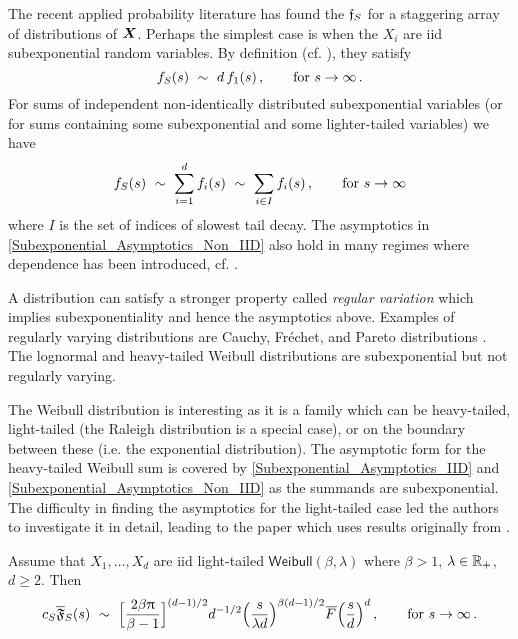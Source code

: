 The recent applied probability literature has found the $\mathfrak{f}_S$ for a staggering array of distributions of $\bm{X}$. Perhaps the simplest case is when the $X_i$ are iid subexponential random variables. By definition (cf. \cite{foss2011introduction}), they satisfy
\begin{equation} \label{Subexponential_Asymptotics_IID}
f_S(s)\ \sim\ d \, f_1(s) \,,\qquad \text{for } s \to \infty\,.
\end{equation}
For sums of independent non-identically distributed subexponential variables (or for sums containing some subexponential and some lighter-tailed variables) we have
\begin{equation} \label{Subexponential_Asymptotics_Non_IID}
f_S(s)\ \sim\ \sum_{i=1}^d f_i(s)\ \sim\ \sum_{i\in I} f_i(s) \,,\qquad \text{for } s \to \infty
\end{equation}
where $I$ is the set of indices of slowest tail decay. The asymptotics in \eqref{Subexponential_Asymptotics_Non_IID} also hold in many regimes where dependence has been introduced, cf. \cite{foss2010sums,wuthrich2003asymptotic,alink2004diversification,alink2007diversification}.

A distribution can satisfy a stronger property called \emph{regular variation} which implies subexponentiality and hence the asymptotics above. Examples of regularly varying distributions are Cauchy, Fr\'{e}chet, and Pareto distributions \cite{bingham1989regular}. The lognormal and heavy-tailed Weibull distributions are subexponential but not regularly varying.

The Weibull distribution is interesting as it is a family which can be heavy-tailed, light-tailed (the Raleigh distribution is a special case), or on the boundary between these (i.e. the exponential distribution). The asymptotic form for the heavy-tailed Weibull sum is covered by \eqref{Subexponential_Asymptotics_IID} and \eqref{Subexponential_Asymptotics_Non_IID} as the summands are subexponential. The difficulty in finding the asymptotics for the light-tailed case led the authors to investigate it in detail, leading to the paper \cite{asmussen2017tail} which uses results originally from \cite{balkema1993densities}.

\begin{proposition} \label{prop:light_weibull} Assume that $X_1, \dots, X_d$ are iid light-tailed $\mathsf{Weibull}(\beta, \lambda)$ where $\beta>1$, $\lambda \in \mathbb{R}_+$, $d \ge 2$. Then
\begin{equation*}
c_S\AsymFTail(s)\ \sim\ \Bigl[ \frac{2\beta\pi}{\beta-1}\Bigr]^{(d-1)/2} d^{-1/2} \Big( \frac{s}{\lambda d} \Big)^{\beta(d-1)/2} \Ftail \Big( \frac{s}{d} \Big)^d \for{s \to \infty}\,.
\end{equation*}
\end{proposition}

